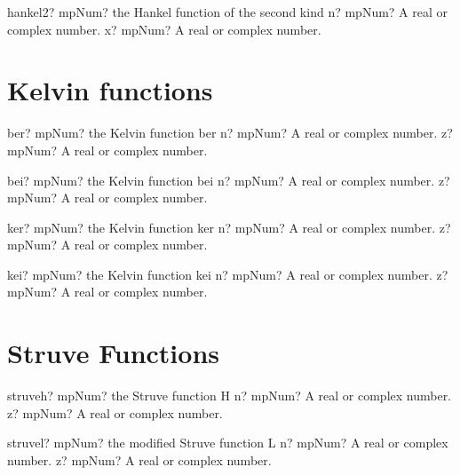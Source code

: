 \documentclass[12pt,a4paper,openany]{book}
\begin{document}
\begin{mpFunctionsExtract}
\mpFunctionTwo
{hankel2? mpNum? the Hankel function of the second kind}
{n? mpNum? A real or complex number.}
{x? mpNum? A real or complex number.}
\end{mpFunctionsExtract}

\section{Kelvin functions}

\begin{mpFunctionsExtract}
\mpFunctionTwo
{ber? mpNum? the Kelvin function ber}
{n? mpNum? A real or complex number.}
{z? mpNum? A real or complex number.}
\end{mpFunctionsExtract}

\begin{mpFunctionsExtract}
\mpFunctionTwo
{bei? mpNum? the Kelvin function bei}
{n? mpNum? A real or complex number.}
{z? mpNum? A real or complex number.}
\end{mpFunctionsExtract}

\begin{mpFunctionsExtract}
\mpFunctionTwo
{ker? mpNum? the Kelvin function ker}
{n? mpNum? A real or complex number.}
{z? mpNum? A real or complex number.}
\end{mpFunctionsExtract}

\begin{mpFunctionsExtract}
\mpFunctionTwo
{kei? mpNum? the Kelvin function kei}
{n? mpNum? A real or complex number.}
{z? mpNum? A real or complex number.}
\end{mpFunctionsExtract}

\section{Struve Functions}

\begin{mpFunctionsExtract}
\mpFunctionTwo
{struveh? mpNum? the Struve function H}
{n? mpNum? A real or complex number.}
{z? mpNum? A real or complex number.}
\end{mpFunctionsExtract}

\begin{mpFunctionsExtract}
\mpFunctionTwo
{struvel? mpNum? the modified Struve function L}
{n? mpNum? A real or complex number.}
{z? mpNum? A real or complex number.}
\end{mpFunctionsExtract}
\end{document}
